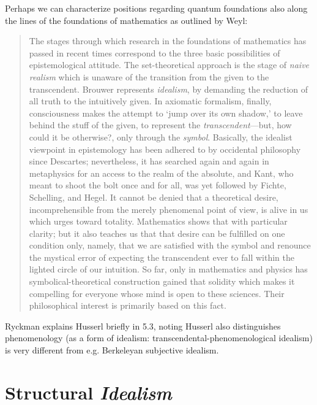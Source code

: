 Perhaps we can characterize positions regarding quantum foundations also along the lines of the foundations of mathematics as outlined by Weyl:

\begin{quote}
    The stages through which research in the foundations of mathematics has passed in recent times correspond to the three basic possibilities of epistemological attitude.  The set-theoretical approach is the stage of \emph{naive realism} which is unaware of the transition from the given to the transcendent.  Brouwer represents \emph{idealism}, by demanding the reduction of all truth to the intuitively given.  In axiomatic formalism, finally, consciousness makes the attempt to `jump over its own shadow,' to leave behind the stuff of the given, to represent the \emph{transcendent}---but, how could it be otherwise?, only through the \emph{symbol}.  Basically, the idealist viewpoint in epistemology has been adhered to by occidental philosophy since Descartes; nevertheless, it has searched again and again in metaphysics for an access to the realm of the absolute, and Kant, who meant to shoot the bolt once and for all, was yet followed by Fichte, Schelling, and Hegel.  It cannot be denied that a theoretical desire, incomprehensible from the merely phenomenal point of view, is alive in us which urges toward totality. Mathematics shows that with particular clarity; but it also teaches us that that desire can be fulfilled on one condition only, namely, that we are satisfied with the symbol and renounce the mystical error of expecting the transcendent ever to fall within the lighted circle of our intuition.  So far, only in mathematics and physics has symbolical-theoretical construction gained that solidity which makes it compelling for everyone whose mind is open to these sciences.  Their philosophical interest is primarily based on this fact.

    \citep[p. 65-66]{Weyl1949}
\end{quote}




Ryckman explains Husserl briefly in 5.3, noting Husserl also distinguishes phenomenology (as a form of idealism: transcendental-phenomenological idealism) is very different from e.g. Berkeleyan subjective idealism.


\section{Structural \emph{Idealism}}

